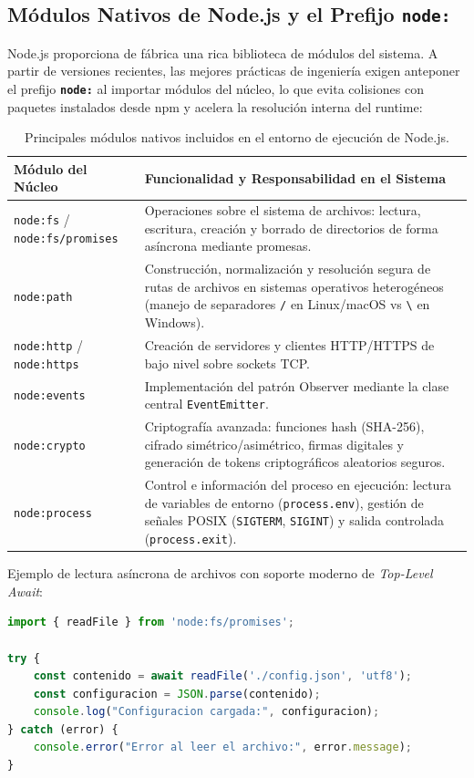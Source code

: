 \subsection{Módulos Nativos de Node.js y el Prefijo \texttt{node:}}

Node.js proporciona de fábrica una rica biblioteca de módulos del sistema. A partir de versiones recientes, las mejores prácticas de ingeniería exigen anteponer el prefijo \textbf{\texttt{node:}} al importar módulos del núcleo, lo que evita colisiones con paquetes instalados desde npm y acelera la resolución interna del runtime:

\begin{table}[htbp]
\centering
\small
\begin{tabularx}{\textwidth}{p{3.2cm} X}
\toprule
\textbf{Módulo del Núcleo} & \textbf{Funcionalidad y Responsabilidad en el Sistema} \\
\midrule
\texttt{node:fs} / \texttt{node:fs/promises} & Operaciones sobre el sistema de archivos: lectura, escritura, creación y borrado de directorios de forma asíncrona mediante promesas. \\
\addlinespace
\texttt{node:path} & Construcción, normalización y resolución segura de rutas de archivos en sistemas operativos heterogéneos (manejo de separadores \texttt{/} en Linux/macOS vs \texttt{\textbackslash} en Windows). \\
\addlinespace
\texttt{node:http} / \texttt{node:https} & Creación de servidores y clientes HTTP/HTTPS de bajo nivel sobre sockets TCP. \\
\addlinespace
\texttt{node:events} & Implementación del patrón Observer mediante la clase central \texttt{EventEmitter}. \\
\addlinespace
\texttt{node:crypto} & Criptografía avanzada: funciones hash (SHA-256), cifrado simétrico/asimétrico, firmas digitales y generación de tokens criptográficos aleatorios seguros. \\
\addlinespace
\texttt{node:process} & Control e información del proceso en ejecución: lectura de variables de entorno (\texttt{process.env}), gestión de señales POSIX (\texttt{SIGTERM}, \texttt{SIGINT}) y salida controlada (\texttt{process.exit}). \\
\bottomrule
\end{tabularx}
\caption{Principales módulos nativos incluidos en el entorno de ejecución de Node.js.}
\label{tab:node-core-modules}
\end{table}

Ejemplo de lectura asíncrona de archivos con soporte moderno de \emph{Top-Level Await}:
\begin{lstlisting}[language=javascript]
import { readFile } from 'node:fs/promises';

try {
    const contenido = await readFile('./config.json', 'utf8');
    const configuracion = JSON.parse(contenido);
    console.log("Configuracion cargada:", configuracion);
} catch (error) {
    console.error("Error al leer el archivo:", error.message);
}
\end{lstlisting}

